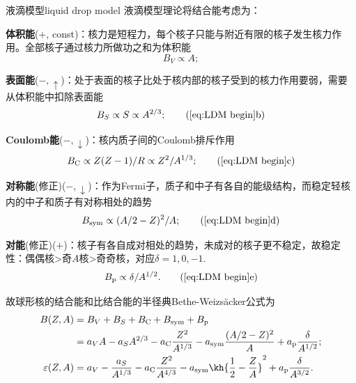 \begin{theorem}{液滴模型}{liquid drop model}
	液滴模型理论将结合能考虑为：
	\begin{compactenum}
		\item\textbf{体积能}($+$, const)：核力是短程力，每个核子只能与附近有限的核子发生核力作用。全部核子通过核力所做功之和为体积能
		\begin{subequations}
			\label{eqn:LDM begin}
			\begin{equation}
				\label{eqn:LDM volume energy}
				B_V\propto A;
			\end{equation}
		\end{subequations}
		\item\textbf{表面能}($-,\uparrow$)：处于表面的核子比处于核内部的核子受到的核力作用要弱，需要从体积能中扣除表面能
		\begin{equation}
			\label{eqn:LDM surface energy}
			B_S\propto S\propto A^{2/3};
			\tag{\ref{eq:LDM begin}b}
		\end{equation}
		\item\textbf{Coulomb能}($-,\downarrow$)：核内质子间的Coulomb排斥作用
		\begin{equation}
			\label{eqn:LDM Coulomb energy}
			B_\mathrm C\propto Z(Z-1)/R\propto Z^2/A^{1/3};
			\tag{\ref{eq:LDM begin}c}
		\end{equation}
		\item\textbf{对称能}(修正)($-,\downarrow$)：作为Fermi子，质子和中子有各自的能级结构，而稳定轻核内的中子和质子有对称相处的趋势
		\begin{equation}
			\label{eqn:LDM symmetry energy}
			B_\mathrm{sym}\propto(A/2-Z)^2/A;
			\tag{\ref{eq:LDM begin}d}
		\end{equation}
		\item\textbf{对能}(修正)($+$)：核子有各自成对相处的趋势，未成对的核子更不稳定，故稳定性：偶偶核>奇$A$核>奇奇核，对应$\delta=1,0,-1.$
		\begin{equation}
			\label{eqn:LDM pairing energy}
			B_\mathrm p\propto\delta/A^{1/2}.
			\tag{\ref{eq:LDM begin}e}
		\end{equation}
	\end{compactenum}
	故球形核的结合能和比结合能的半径典Bethe-Weizs\"acker公式为
	\begin{subequations}
		\begin{align}
			\notag
			B(Z,A)&=B_V+B_S+B_\mathrm C+B_\mathrm{sym}+B_\mathrm p\\
			\label{liquid-drop model BE}
			&=a_VA-a_SA^{2/3}-a_\mathrm C\frac{Z^2}{A^{1/3}}-a_\mathrm{sym}\frac{(A/2-Z)^2}{A}+a_\mathrm p\frac{\delta}{A^{1/2}};\\
			\label{liquid-drop model SBE}
			\varepsilon(Z,A)&=a_V-\frac{a_S}{A^{1/3}}-a_\mathrm C\frac{Z^2}{A^{4/3}}-a_\mathrm{sym}\kh{\frac12-\frac ZA}^2+a_\mathrm p\frac{\delta}{A^{3/2}}.
		\end{align}
	\end{subequations}
\end{theorem}


